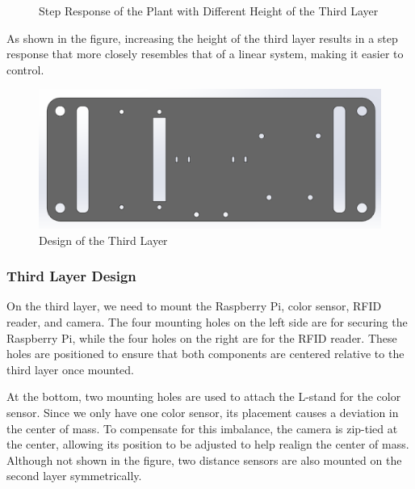\documentclass{article}
\begin{document}
\begin{figure}[H]
    \centerline{}
    \caption{Step Response of the Plant with Different Height of the Third Layer}
\end{figure}

As shown in the figure, increasing the height of the third layer results in a
step response that more closely resembles that of a linear system, making it
easier to control.

\begin{figure}[H]
    \centerline{\includegraphics[width=\linewidth]{Figures/3rdlayer.png}}
    \caption{Design of the Third Layer}
\end{figure}

\subsubsection{Third Layer Design}
On the third layer, we need to mount the Raspberry Pi, color sensor, RFID
reader, and camera. The four mounting holes on the left side are for securing
the Raspberry Pi, while the four holes on the right are for the RFID reader.
These holes are positioned to ensure that both components are centered relative
to the third layer once mounted.

At the bottom, two mounting holes are used to attach the L-stand for the color
sensor. Since we only have one color sensor, its placement causes a deviation in
the center of mass. To compensate for this imbalance, the camera is zip-tied at
the center, allowing its position to be adjusted to help realign the center of
mass. Although not shown in the figure, two distance sensors are also mounted on
the second layer symmetrically.
\end{document}
